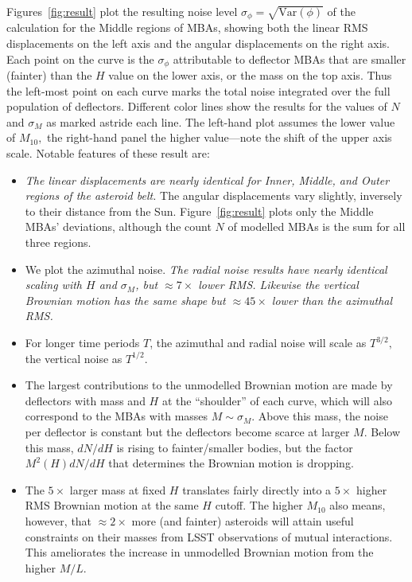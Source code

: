 \documentclass[linenumbers, onecolumn]{aastex631}
\newcommand\edited[1]{{\color{red} {#1}}}
\newcommand{\Var}{\textrm{Var}}
\begin{document}
Figures~\ref{fig:result} plot the resulting noise level $\sigma_\phi=\sqrt{\Var(\phi)}$ of the calculation for the Middle regions of MBAs, showing both the linear RMS displacements on the left axis and the angular displacements on the right axis.  Each point on the curve is the $\sigma_\phi$ attributable to deflector MBAs that are smaller (fainter) than the $H$ value on the lower axis, or the mass on the top axis.  Thus the left-most point on each curve marks the total noise integrated over the full population of deflectors. Different color lines show the results for the values of $N$ and $\sigma_M$ as marked astride each line.  \edited{The left-hand plot assumes the lower value of $M_{10},$ the right-hand panel the higher value---note the shift of the upper axis scale.}  
Notable features of these result are:
\begin{itemize}
\item \emph{The linear displacements are nearly identical for Inner,
    Middle, and Outer regions of the asteroid belt.}  The angular
  displacements vary slightly, inversely to their distance from the
  Sun.  Figure~\ref{fig:result} plots only the Middle MBAs'
  deviations, although the count $N$ of modelled MBAs is the sum for
  all three regions.
\item We plot the azimuthal noise.  \emph{The radial noise results
    have nearly identical scaling with $H$ and $\sigma_M$, but
    $\approx 7\times$ lower RMS. Likewise the vertical Brownian motion
    has the same shape but $\approx45\times$ lower than the azimuthal RMS.}
\item For longer time periods $T$, the azimuthal and radial noise will scale as
$T^{3/2},$ the vertical
noise as $T^{1/2}.$
\item The largest contributions to the unmodelled Brownian motion are
made by deflectors with mass and $H$ at the ``shoulder'' of each
curve, which will also correspond to the MBAs with masses $M\sim
\sigma_M$.  Above this mass, the noise per deflector is constant but
the deflectors become scarce at larger $M.$ Below this mass, $dN/dH$
is rising to fainter/smaller bodies, but the factor $M^2(H) dN/dH$
that determines the Brownian motion is dropping.
\item \edited{The $5\times$ larger mass at fixed $H$ translates fairly directly
    into a $5\times$ higher RMS Brownian motion at the same $H$ cutoff.  The
    higher $M_{10}$ also means, however, that $\approx2\times$ more (and
    fainter) asteroids will attain useful constraints on their masses from LSST
    observations of mutual interactions.  This ameliorates the increase in
    unmodelled Brownian motion from the higher $M/L.$}
\end{itemize}
\end{document}
